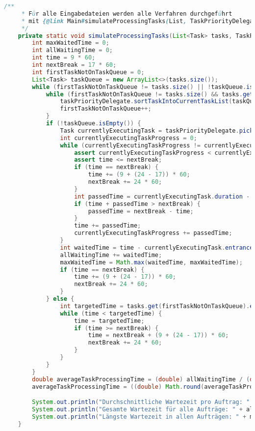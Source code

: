 \documentclass[a4paper,10pt,ngerman]{scrartcl}
\begin{document}
\begin{lstlisting}[frame=single,language=Java,title=Methode simulateProcessingTasks,breaklines=true]
	/**
     * Für alle Eingabedateien werden alle Verfahren durchgeführt
     * mit {@link Main#simulateProcessingTasks(List, TaskPriorityDelegate)}.
     */
	private static void simulateProcessingTasks(List<Task> tasks, TaskPriorityDelegate taskPriorityDelegate) {
        int maxWaitedTime = 0;
        int allWaitingTime = 0;
        int time = 9 * 60;
        int nextBreak = 17 * 60;
        int firstTaskNotOnTaskQueue = 0;
        List<Task> taskQueue = new ArrayList<>(tasks.size());
        while (firstTaskNotOnTaskQueue != tasks.size() || !taskQueue.isEmpty()) {
            while (firstTaskNotOnTaskQueue != tasks.size() && tasks.get(firstTaskNotOnTaskQueue).entranceTime <= time) {
                taskPriorityDelegate.sortTaskIntoCurrentTaskList(taskQueue, tasks.get(firstTaskNotOnTaskQueue));
                firstTaskNotOnTaskQueue++;
            }
            if (!taskQueue.isEmpty()) {
                Task currentlyExecutingTask = taskPriorityDelegate.pickTask(taskQueue);
                int currentlyExecutingTaskProgress = 0;
                while (currentlyExecutingTaskProgress != currentlyExecutingTask.duration) {
                    assert currentlyExecutingTaskProgress < currentlyExecutingTask.duration;
                    assert time <= nextBreak;
                    if (time == nextBreak) {
                        time += (9 + (24 - 17)) * 60;
                        nextBreak += 24 * 60;
                    }
                    int passedTime = currentlyExecutingTask.duration - currentlyExecutingTaskProgress;
                    if (time + passedTime > nextBreak) {
                        passedTime = nextBreak - time;
                    }
                    time += passedTime;
                    currentlyExecutingTaskProgress += passedTime;
                }
                int waitedTime = time - currentlyExecutingTask.entranceTime;
                allWaitingTime += waitedTime;
                maxWaitedTime = Math.max(waitedTime, maxWaitedTime);
                if (time == nextBreak) {
                    time += (9 + (24 - 17)) * 60;
                    nextBreak += 24 * 60;
                }
            } else {
                int targetedTime = tasks.get(firstTaskNotOnTaskQueue).entranceTime;
                while (time < targetedTime) {
                    time = targetedTime;
                    if (time >= nextBreak) {
                        time = nextBreak + (9 + (24 - 17)) * 60;
                        nextBreak += 24 * 60;
                    }
                }
            }
        }
        double averageTaskProcessingTime = (double) allWaitingTime / (double) tasks.size();
        averageTaskProcessingTime = ((double) Math.round(averageTaskProcessingTime * 10)) / 10;

        System.out.println("Durchschnittliche Wartezeit pro Auftrag: " + averageTaskProcessingTime + " minuten");
        System.out.println("Gesamte Wartezeit für alle Aufträge: " + allWaitingTime + " minuten");
        System.out.println("Längste Wartezeit in allen Aufträgen: " + maxWaitedTime + " minuten");
    }
	\end{lstlisting}
\end{document}
